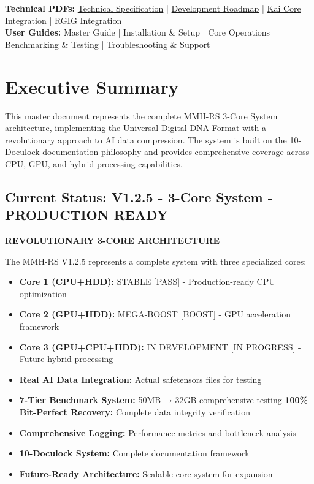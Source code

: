 \documentclass[12pt,a4paper]{article}
\begin{document}
\begin{tcolorbox}[colback=blue!10,colframe=blue!50,title=\textbf{Complete Documentation Suite}]
\textbf{Technical PDFs:} \href{MMH-RS_TECHNICAL_COMPLETE.pdf}{Technical Specification} | \href{MMH-RS_ROADMAP_COMPLETE.pdf}{Development Roadmap} | \href{KAI_CORE_INTEGRATION_COMPLETE.pdf}{Kai Core Integration} | \href{RGIG_INTEGRATION_COMPLETE.pdf}{RGIG Integration}\\
\textbf{User Guides:} Master Guide | Installation \& Setup | Core Operations | Benchmarking \& Testing | Troubleshooting \& Support
\end{tcolorbox}

\tableofcontents
\newpage

\section{Executive Summary}

This master document represents the complete MMH-RS 3-Core System architecture, implementing the Universal Digital DNA Format with a revolutionary approach to AI data compression. The system is built on the 10-Doculock documentation philosophy and provides comprehensive coverage across CPU, GPU, and hybrid processing capabilities.

\subsection{Current Status: V1.2.5 - 3-Core System - PRODUCTION READY}

\textbf{REVOLUTIONARY 3-CORE ARCHITECTURE}

The MMH-RS V1.2.5 represents a complete system with three specialized cores:

\begin{itemize}
    \item \textbf{Core 1 (CPU+HDD):} STABLE [PASS] - Production-ready CPU optimization
    \item \textbf{Core 2 (GPU+HDD):} MEGA-BOOST [BOOST] - GPU acceleration framework
    \item \textbf{Core 3 (GPU+CPU+HDD):} IN DEVELOPMENT [IN PROGRESS] - Future hybrid processing
    \item \textbf{Real AI Data Integration:} Actual safetensors files for testing
    \item \textbf{7-Tier Benchmark System:} 50MB → 32GB comprehensive testing
    \textbf{100\% Bit-Perfect Recovery:} Complete data integrity verification
    \item \textbf{Comprehensive Logging:} Performance metrics and bottleneck analysis
    \item \textbf{10-Doculock System:} Complete documentation framework
    \item \textbf{Future-Ready Architecture:} Scalable core system for expansion
\end{itemize}
\end{document}
